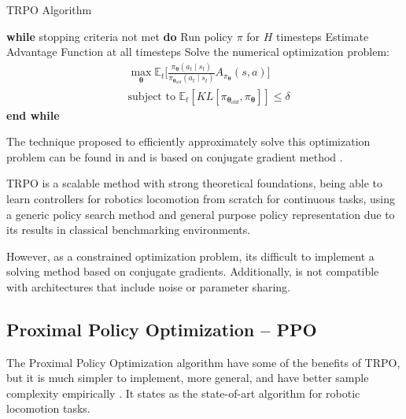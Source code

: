 \begin{algorithm}[!htbp]
	\caption{TRPO Algorithm}
	\begin{algorithmic}
		\STATE \textbf{while} stopping criteria not met \textbf{do}
		\STATE \hspace{5mm} Run policy $\pi$ for $H$ timesteps
		\STATE \hspace{5mm} Estimate Advantage Function at all timesteps
		\STATE \hspace{5mm} Solve the numerical optimization problem:
		\STATE \hspace{5mm} \begin{align*}
		&  \max_{\boldsymbol{\theta}}  \mathbb{E}_{t}\Big[\frac{\pi_{\boldsymbol{\theta}}(a_{t} \mid s_{t})}{\pi_{\boldsymbol{\theta}_{old}}(a_{t} \mid s_{t})}A_{\pi_{\boldsymbol{\theta}}}(s,a)\Big]\\ &  \text{subject to }  \mathbb{E}_{t}[KL[\pi_{\boldsymbol{\theta}_{old}}, \pi_{\boldsymbol{\theta}}]] \leq \delta \nonumber
		\end{align*} 
		\STATE \textbf{end while}
	\end{algorithmic}
	\label{alg:trpo}
\end{algorithm}

The technique proposed to efficiently approximately solve this optimization problem can be found in \cite{trpo} and is based on conjugate gradient method \cite{Hestenes&Stiefel:1952}.

TRPO is a scalable method with strong theoretical foundations, being able to learn controllers for robotics locomotion from scratch for continuous tasks, using a generic policy search method and general purpose policy representation due to its results in classical benchmarking environments.

However, as a constrained optimization problem, its difficult to implement a solving method based on conjugate gradients. Additionally, is not compatible with architectures that include noise or parameter sharing.


\subsection{Proximal Policy Optimization -- PPO}

The Proximal Policy Optimization algorithm have some of the benefits of TRPO, but it is much simpler to implement, more general, and have better sample
complexity empirically \cite{ppoalgorithm}. It states as the state-of-art algorithm for robotic locomotion tasks.


